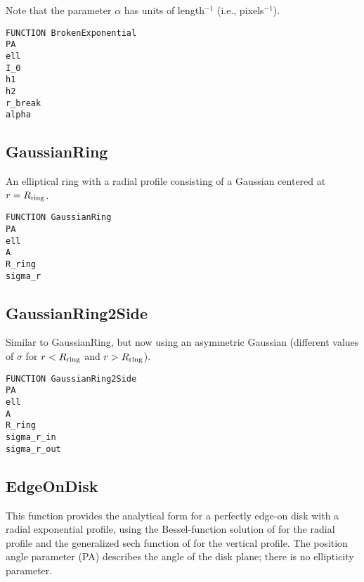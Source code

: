 \documentclass[10pt]{article}
\begin{document}
Note that the parameter $\alpha$ has units of length$^{-1}$ (i.e., pixels$^{-1}$).

\begin{verbatim}
FUNCTION BrokenExponential
PA
ell
I_0
h1
h2
r_break
alpha
\end{verbatim}


\subsection{GaussianRing}

An elliptical ring with a radial profile consisting of a Gaussian
centered at $r = R_{\rm ring}$.

\begin{verbatim}
FUNCTION GaussianRing
PA
ell
A
R_ring
sigma_r
\end{verbatim}


\subsection{GaussianRing2Side}

Similar to GaussianRing, but now using an asymmetric Gaussian (different
values of $\sigma$ for $r < R_{\rm ring}$ and $r > R_{\rm ring}$).

\begin{verbatim}
FUNCTION GaussianRing2Side
PA
ell
A
R_ring
sigma_r_in
sigma_r_out
\end{verbatim}


\subsection{EdgeOnDisk}

This function provides the analytical form for a perfectly edge-on disk with a radial exponential
profile, using the Bessel-function solution of \citet{vdk81} for 
the radial profile and the generalized sech function of \citet{vdk88} 
for the vertical profile. The position angle parameter (PA) describes the angle of
the disk plane; there is no ellipticity parameter.

\end{document}
